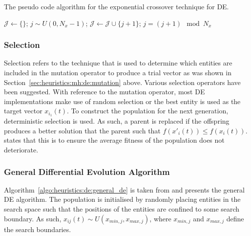\begin{algorithm}[H]
      \caption{The pseudo code algorithm for the exponential crossover technique for \ac{DE}.}
      \label{algo:heuristics:de:exp}
      \begin{algorithmic}
            \State $\mathcal{J} \gets \{\}$;
            \State $j \sim U(0,N_{x} - 1)$;
            \Repeat
            \State $\mathcal{J} \gets \mathcal{J} \cup \{j + 1 \}$;
            \State $j = (j+1) \mod N_{x}$
      \end{algorithmic}
\end{algorithm}

\subsubsection{Selection}
\label{sec:heuristics:mh:de:selection}

Selection refers to the technique that is used to determine which entities are included in the mutation operator to produce a trial vector \cite{ref:engelbrecht:2007} as was shown in Section~\ref{sec:heuristics:mh:de:mutation} above. Various selection operators have been suggested. With reference to the mutation operator, most \ac{DE} implementations make use of random selection or the best entity is used as the target vector $x_{i_{1}}(t)$. To construct the population for the next generation, deterministic selection is used. As such, a parent is replaced if the offspring produces a better solution that the parent such that $f(x'_{i}(t)) \leq f(x_{i}(t))$. \citeauthor{ref:engelbrecht:2007}\cite{ref:engelbrecht:2007} states that this is to ensure the average fitness of the population does not deteriorate.


\subsubsection{General Differential Evolution Algorithm}

Algorithm~\ref{algo:heuristics:de:general_de} is taken from \cite{ref:engelbrecht:2007} and presents the general \ac{DE} algorithm. The population is initialised by randomly placing entities in the search space such that the positions of the entities are confined to some search boundary. As such, $x_{ij}(t) \sim U(x_{min,j}, x_{max,j})$, where $x_{min,j}$ and $x_{max,j}$ define the search boundaries.

